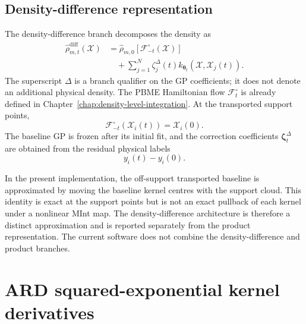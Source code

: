 \documentclass[
  11pt,
  letterpaper,
  onehalfspacing,
  normalmargins,
  equalmargins,
  oneside
]{ut-thesis}
\begin{document}
\subsection{Density-difference representation}
\label{appsubsec:density-difference}

The density-difference branch decomposes the density as
\begin{align}
\widehat{\rho}_{m,t}^{\mathrm{diff}}
(\boldsymbol{\mathcal X})
&=
\widehat{\rho}_{m,0}
\left[
\mathcal F_{-t}^{\circ}
(\boldsymbol{\mathcal X})
\right]
\nonumber\\
&\quad+
\sum_{j=1}^{N}
\zeta_j^{\Delta}(t)
 k_{\boldsymbol\theta_t}
\left(
\boldsymbol{\mathcal X},
\boldsymbol{\mathcal X}_j(t)
\right).
\label{appeq:density-difference-representation}
\end{align}
The superscript \(\Delta\) is a branch qualifier on the GP coefficients; it
does not denote an additional physical density. The PBME Hamiltonian flow
\(\mathcal F_t^\circ\) is already defined in
Chapter~\ref{chap:density-level-integration}. At the transported support
points,
\[
\mathcal F_{-t}^{\circ}
\left(
\boldsymbol{\mathcal X}_i(t)
\right)
=
\boldsymbol{\mathcal X}_i(0).
\]
The baseline GP is frozen after its initial fit, and the correction
coefficients \(\boldsymbol\zeta_t^{\Delta}\) are obtained from the residual
physical labels
\begin{equation}
y_i(t)-y_i(0).
\label{appeq:density-difference-label}
\end{equation}

In the present implementation, the off-support transported baseline is
approximated by moving the baseline kernel centres with the support cloud.
This identity is exact at the support points but is not an exact pullback of
each kernel under a nonlinear MInt map.  The density-difference architecture
is therefore a distinct approximation and is reported separately from the
product representation.  The current software does not combine the
density-difference and product branches.

\section{ARD squared-exponential kernel derivatives}
\label{appsec:ard-derivatives}
\end{document}
